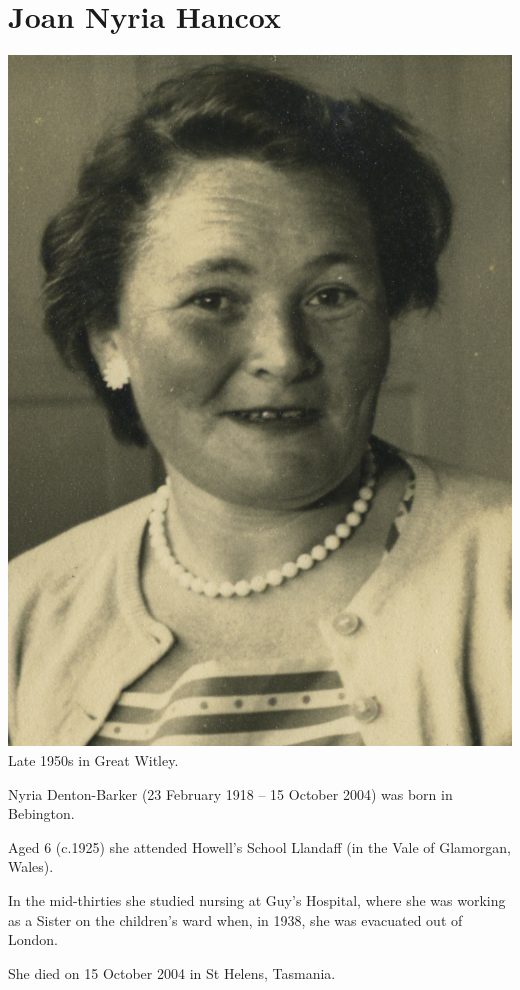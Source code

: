\section{Joan Nyria Hancox}\label{Joan_Nyria_Hancox}

\begin{center}
\includegraphics[width=0.8\linewidth]{photos/Joan_Nyria_Hancox} \\
{\footnotesize Late 1950s in Great Witley.\cite{FlickrNyria}}
\end{center}

Nyria Denton-Barker (23 February 1918 -- 15 October 2004) was born in Bebington.\cite{BMDIndex_JoanNyriaHancox_birth}

Aged 6 (c.1925) she attended Howell's School Llandaff (in the Vale of Glamorgan, Wales).\cite{OralHistoryJDB2008}

In the mid-thirties she studied nursing at Guy's Hospital, where she was working as a Sister on the children's ward when, in 1938, she was evacuated out of London.

She died on 15 October 2004 in St Helens, Tasmania.

